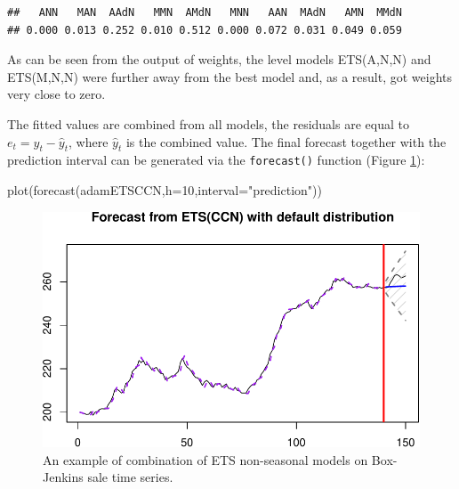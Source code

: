 \documentclass[
]{book}
\newenvironment{Shaded}{\begin{snugshade}}{\end{snugshade}}
\newcommand{\AttributeTok}[1]{\textcolor[rgb]{0.77,0.63,0.00}{#1}}
\newcommand{\DecValTok}[1]{\textcolor[rgb]{0.00,0.00,0.81}{#1}}
\newcommand{\FunctionTok}[1]{\textcolor[rgb]{0.00,0.00,0.00}{#1}}
\newcommand{\NormalTok}[1]{#1}
\newcommand{\SpecialCharTok}[1]{\textcolor[rgb]{0.00,0.00,0.00}{#1}}
\newcommand{\StringTok}[1]{\textcolor[rgb]{0.31,0.60,0.02}{#1}}
\theoremstyle{definition}
\theoremstyle{definition}
\theoremstyle{definition}
\theoremstyle{definition}
\theoremstyle{remark}
\begin{document}
\begin{Shaded}
\end{Shaded}

\begin{verbatim}
##   ANN   MAN  AAdN   MMN  AMdN   MNN   AAN  MAdN   AMN  MMdN 
## 0.000 0.013 0.252 0.010 0.512 0.000 0.072 0.031 0.049 0.059
\end{verbatim}

As can be seen from the output of weights, the level models ETS(A,N,N) and ETS(M,N,N) were further away from the best model and, as a result, got weights very close to zero.

The fitted values are combined from all models, the residuals are equal to \(e_t = y_t -\hat{y}_t\), where \(\hat{y}_t\) is the combined value. The final forecast together with the prediction interval can be generated via the \texttt{forecast()} function (Figure \ref{fig:adamETSCCN}):

\begin{Shaded}
\begin{Highlighting}[]
\FunctionTok{plot}\NormalTok{(}\FunctionTok{forecast}\NormalTok{(adamETSCCN,}\AttributeTok{h=}\DecValTok{10}\NormalTok{,}\AttributeTok{interval=}\StringTok{"prediction"}\NormalTok{))}
\end{Highlighting}
\end{Shaded}

\begin{figure}
\centering
\includegraphics{Svetunkov--2022----ADAM_files/figure-latex/adamETSCCN-1.pdf}
\caption{\label{fig:adamETSCCN}An example of combination of ETS non-seasonal models on Box-Jenkins sale time series.}
\end{figure}
\end{document}
